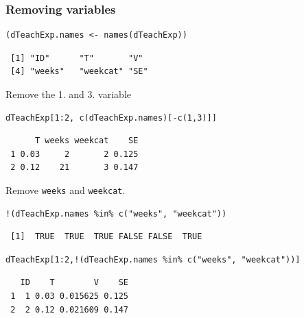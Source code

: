 \documentclass[bigger]{beamer}
\begin{document}
\begin{frame}[fragile,shrink = 15]
\frametitle{Removing variables}
\label{sec-4-1-8}


\lstset{language=R}
\begin{lstlisting}
(dTeachExp.names <- names(dTeachExp))
\end{lstlisting}

\begin{verbatim}
 [1] "ID"      "T"       "V"      
 [4] "weeks"   "weekcat" "SE"
\end{verbatim}

    Remove the 1. and 3. variable

\lstset{language=R}
\begin{lstlisting}
dTeachExp[1:2, c(dTeachExp.names)[-c(1,3)]]
\end{lstlisting}

\begin{verbatim}
      T weeks weekcat    SE
 1 0.03     2       2 0.125
 2 0.12    21       3 0.147
\end{verbatim}

     Remove \texttt{weeks} and \texttt{weekcat}.

\lstset{language=R}
\begin{lstlisting}
!(dTeachExp.names %in% c("weeks", "weekcat"))
\end{lstlisting}

\begin{verbatim}
 [1]  TRUE  TRUE  TRUE FALSE FALSE  TRUE
\end{verbatim}


\lstset{language=R}
\begin{lstlisting}
dTeachExp[1:2,!(dTeachExp.names %in% c("weeks", "weekcat"))]
\end{lstlisting}

\begin{verbatim}
   ID    T        V    SE
 1  1 0.03 0.015625 0.125
 2  2 0.12 0.021609 0.147
\end{verbatim}

\end{frame}
\end{document}
